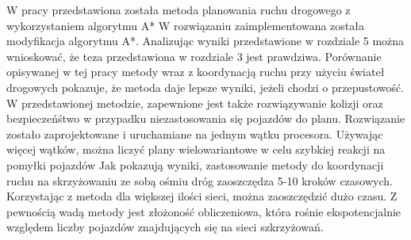 \label{chap:conclusions}

W pracy przedstawiona została metoda planowania ruchu drogowego z wykorzystaniem algorytmu A*
\newline
\newline
W rozwiązaniu zaimplementowana została modyfikacja algorytmu A*.
\newline
\newline
Analizując wyniki przedstawione w rozdziale 5 można wnioskować, że teza przedstawiona w rozdziale 3 jest prawdziwa. 
\newline
\newline
Porównanie opisywanej w tej pracy metody wraz z koordynacją ruchu przy użyciu świateł drogowych pokazuje, że metoda daje lepsze wyniki, jeżeli chodzi o przepustowość.
\newline
\newline
W przedstawionej metodzie, zapewnione jest także rozwiązywanie kolizji oraz bezpieczeńśtwo w przypadku niezastosowania się pojazdów do planu.
\newline
\newline
Rozwiązanie zostało zaprojektowane i uruchamiane na jednym wątku procesora. Używając więcej wątków, można liczyć plany wielowariantowe w celu szybkiej reakcji na pomyłki pojazdów
\newline
\newline
Jak pokazują wyniki, zastosowanie metody do koordynacji ruchu na skrzyżowaniu ze sobą ośmiu dróg zaoszczędza 5-10 kroków czasowych. Korzystając z metoda dla większej ilości sieci, można zaoszczędzić dużo czasu.
\newline
\newline
Z pewnością wadą metody jest złożoność obliczeniowa, która rośnie ekspotencjalnie względem liczby pojazdów znajdujących się na sieci szkrzyżowań.

